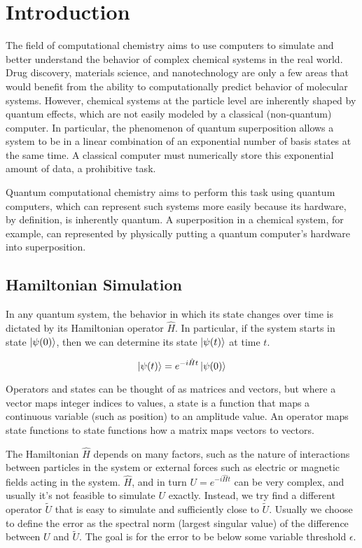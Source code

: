 

\chapter{Introduction}

The field of computational chemistry aims to use computers to simulate and better understand the behavior of complex chemical systems in the real world. Drug discovery, materials science, and nanotechnology are only a few areas that would benefit from the ability to computationally predict behavior of molecular systems. However, chemical systems at the particle level are inherently shaped by quantum effects, which are not easily modeled by a classical (non-quantum) computer. In particular, the phenomenon of quantum superposition allows a system to be in a linear combination of an exponential number of basis states at the same time. A classical computer must numerically store this exponential amount of data, a prohibitive task.

Quantum computational chemistry aims to perform this task using quantum computers, which can represent such systems more easily because its hardware, by definition, is inherently quantum. A superposition in a chemical system, for example, can represented by physically putting a quantum computer's hardware into superposition.

\section{Hamiltonian Simulation}

In any quantum system, the behavior in which its state changes over time is dictated by its Hamiltonian operator $\hat{H}$. In particular, if the system starts in state $\ket{\psi(0)}$, then we can determine its state $\ket{\psi(t)}$ at time $t$.

\begin{equation}
    \ket{\psi(t)} = e^{-i\hat{H}t}\ket{\psi(0)}
\end{equation}

Operators and states can be thought of as matrices and vectors, but where a vector maps integer indices to values, a state is a function that maps a continuous variable (such as position) to an amplitude value. An operator maps state functions to state functions how a matrix maps vectors to vectors.

The Hamiltonian $\hat{H}$ depends on many factors, such as the nature of interactions between particles in the system or external forces such as electric or magnetic fields acting in the system. $\hat{H}$, and in turn $U = e^{-i\hat{H}t}$ can be very complex, and usually it's not feasible to simulate $U$ exactly. Instead, we try find a different operator $\tilde{U}$ that is easy to simulate and sufficiently close to $\tilde{U}$. Usually we choose to define the error as the spectral norm (largest singular value) of the difference between $U$ and $\tilde{U}$. The goal is for the error to be below some variable threshold $\epsilon$.

